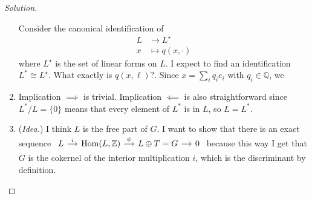 \begin{proof}[Solution]
\begin{enumerate}[label=\alph*.]
	Consider the canonical identification of
		\begin{align*}
			L &\longrightarrow L^\star\\
			x &\longmapsto q(x,\cdot)
		\end{align*}
		where $L^\star$  is the set of linear forms on $L$. I expect to find an identification  $L^*\cong L^\star$. What exactly is $q(x,\ell)?$. Since $x=\sum_{i}q_ie_i$ with $q_i\in\mathbb{Q}$, we\fi

	\item Implication  $\implies $ is trivial. Implication $\impliedby$ is also straightforward since $L^* /L=\{0\}$ means that every element of $L^*$ is in $L$, so $L=L^*$.

	\item (\textit{Idea.}) I think  $L$ is the free part of $G$. I want to show that there is an exact sequence $\begin{tikzcd}[column sep=small]
		L\arrow[r,"i"]&\operatorname{Hom}(L,\mathbb{Z})\arrow[r,"\psi"]&L\oplus T=G\arrow[r]&0
	\end{tikzcd}$ because this way I get that $G$ is the cokernel of the interior multiplication  $i$, which is the discriminant by definition.
\end{enumerate}	
\end{proof}

